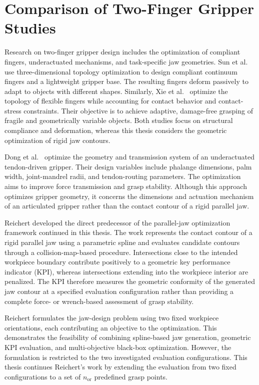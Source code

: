 \section{Comparison of Two-Finger Gripper Studies}

Research on two-finger gripper design includes the optimization of compliant fingers, underactuated mechanisms, and task-specific jaw geometries. Sun
et al.\ \cite{Sun2022LARG} use three-dimensional topology optimization to design compliant continuum fingers and a lightweight gripper base. The
resulting fingers deform passively to adapt to objects with different shapes. Similarly, Xie et al.\ \cite{Xie2024Design} optimize the topology of
flexible fingers while accounting for contact behavior and contact-stress constraints. Their objective is to achieve adaptive, damage-free grasping
of fragile and geometrically variable objects. Both studies focus on structural compliance and deformation, whereas this thesis considers the
geometric optimization of rigid jaw contours.

Dong et al.\ \cite{Dong2018Geometric} optimize the geometry and transmission system of an underactuated tendon-driven gripper. Their design variables
include phalange dimensions, palm width, joint-mandrel radii, and tendon-routing parameters. The optimization aims to improve force transmission and
grasp stability. Although this approach optimizes gripper geometry, it concerns the dimensions and actuation mechanism of an articulated gripper
rather than the contact contour of a rigid parallel jaw.

Reichert \cite{reichert2024greiferoptimierung} developed the direct predecessor of the parallel-jaw optimization framework continued in this thesis. The work
represents the contact contour of a rigid parallel jaw using a parametric spline and evaluates candidate contours through a collision-map-based
procedure. Intersections close to the intended workpiece boundary contribute positively to a geometric key performance indicator (KPI), whereas
intersections extending into the workpiece interior are penalized. The KPI therefore measures the geometric conformity of the generated jaw contour
at a specified evaluation configuration rather than providing a complete force- or wrench-based assessment of grasp stability.

Reichert formulates the jaw-design problem using two fixed workpiece orientations, each contributing an objective to the optimization. This
demonstrates the feasibility of combining spline-based jaw generation, geometric KPI evaluation, and multi-objective black-box optimization. However,
the formulation is restricted to the two investigated evaluation configurations. This thesis continues Reichert's work by extending the evaluation
from two fixed configurations to a set of $n_{\mathrm{or}}$ predefined grasp points. 

